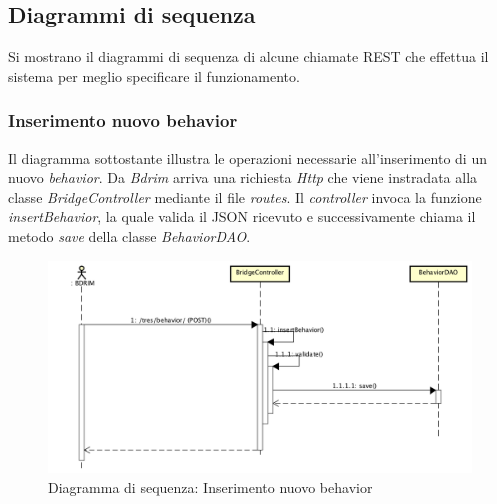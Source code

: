 \subsection{Diagrammi di sequenza}
Si mostrano il diagrammi di sequenza di alcune chiamate \gls{REST} che effettua il sistema per meglio specificare il funzionamento.
\subsubsection*{Inserimento nuovo behavior}
Il diagramma sottostante illustra le operazioni necessarie all'inserimento di un nuovo \textit{behavior}. Da \textit{Bdrim} arriva una richiesta \textit{Http} che viene instradata alla classe \textit{BridgeController} mediante il file \textit{routes}. Il \textit{controller} invoca la funzione \textit{insertBehavior}, la quale valida il \gls{JSON} ricevuto e successivamente chiama il metodo \textit{save} della classe \textit{BehaviorDAO}.
\begin{figure}[h]
\centering
\includegraphics[width=0.9\linewidth]{immagini/sequenzaSalvabehavior}
\caption[Diagramma di sequenza: Inserimento nuovo behavior]{Diagramma di sequenza: Inserimento nuovo behavior}
\label{fig:sequenzaSalvabehavior}
\end{figure}

\newpage

